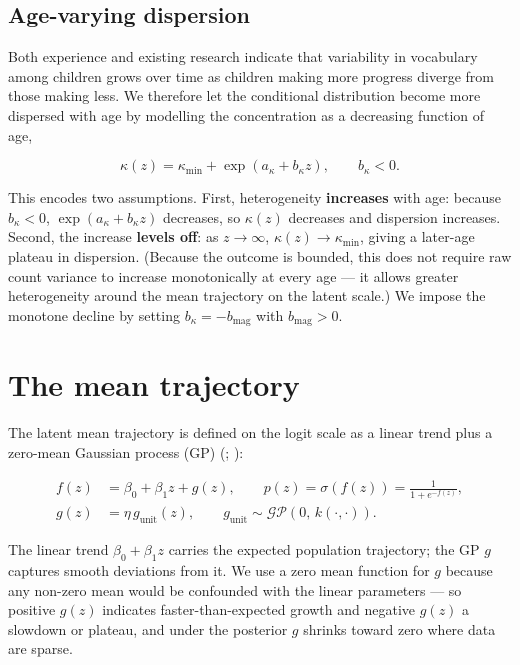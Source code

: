 \documentclass[
  11pt,
  a4paper,
]{report}
\begin{document}
\subsection{Age-varying dispersion}\label{sec-kappa}

Both experience and existing research indicate that variability in
vocabulary among children grows over time as children making more
progress diverge from those making less. We therefore let the
conditional distribution become more dispersed with age by modelling the
concentration as a decreasing function of age,

\[
\kappa(z) = \kappa_{\min} + \exp\!\left(a_\kappa + b_\kappa z\right),
\qquad b_\kappa < 0 .
\]

This encodes two assumptions. First, heterogeneity \textbf{increases}
with age: because \(b_\kappa < 0\), \(\exp(a_\kappa + b_\kappa z)\)
decreases, so \(\kappa(z)\) decreases and dispersion increases. Second,
the increase \textbf{levels off}: as \(z \to \infty\),
\(\kappa(z) \to \kappa_{\min}\), giving a later-age plateau in
dispersion. (Because the outcome is bounded, this does not require raw
count variance to increase monotonically at every age --- it allows
greater heterogeneity around the mean trajectory on the latent scale.)
We impose the monotone decline by setting
\(b_\kappa = -b_{\mathrm{mag}}\) with \(b_{\mathrm{mag}} > 0\).

\section{The mean trajectory}\label{sec-mean}

The latent mean trajectory is defined on the logit scale as a linear
trend plus a zero-mean Gaussian process (GP)
(; ):

\[
\begin{aligned}
f(z) &= \beta_0 + \beta_1 z + g(z), \qquad
p(z) = \sigma\!\left(f(z)\right) = \frac{1}{1 + e^{-f(z)}},\\
g(z) &= \eta\, g_{\mathrm{unit}}(z), \qquad
g_{\mathrm{unit}} \sim \mathcal{GP}\!\left(0,\, k(\cdot,\cdot)\right).
\end{aligned}
\]

The linear trend \(\beta_0 + \beta_1 z\) carries the expected population
trajectory; the GP \(g\) captures smooth deviations from it. We use a
zero mean function for \(g\) because any non-zero mean would be
confounded with the linear parameters --- so positive \(g(z)\) indicates
faster-than-expected growth and negative \(g(z)\) a slowdown or plateau,
and under the posterior \(g\) shrinks toward zero where data are sparse.
\end{document}
